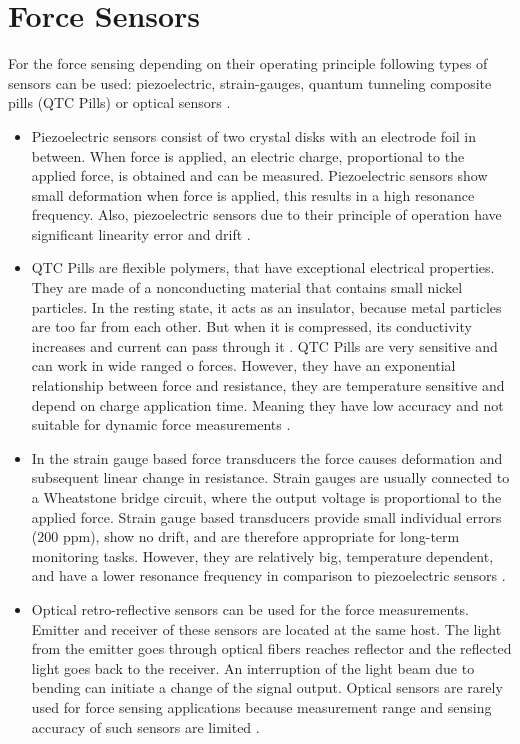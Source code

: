\section{Force Sensors}
\label{sec:ForceSensors}

For the force sensing depending on their operating principle following types of sensors can be used: piezoelectric, strain-gauges, quantum tunneling composite pills (QTC Pills) or optical sensors \cite{SGandP1}.

\begin{itemize}
\item Piezoelectric sensors consist of two crystal disks with an electrode foil in between. When force is applied, an electric charge, proportional to the applied force, is obtained and can be measured. Piezoelectric sensors show small deformation when force is applied, this results in a high resonance frequency. Also, piezoelectric sensors due to their principle of operation have significant linearity error and drift \cite{SGandP2}.

\item QTC Pills are flexible polymers, that have exceptional electrical properties. They are made of a nonconducting material that contains small nickel particles.  In the resting state, it acts as an insulator, because metal particles are too far from each other. But when it is compressed, its conductivity increases and current can pass through it \cite{azaman_characteristic_2016}. QTC Pills are very sensitive and can work in wide ranged o forces. However, they have an exponential relationship between force and resistance, they are temperature sensitive and depend on charge application time. Meaning they have low accuracy and not suitable for dynamic force measurements \cite{_quantum_2010}.

\item In the strain gauge based force transducers the force causes deformation and subsequent linear change in resistance. Strain gauges are usually connected to a Wheatstone bridge circuit, where the output voltage is proportional to the applied force. Strain gauge based transducers provide small individual errors (200 ppm), show no drift, and are therefore appropriate for long-term monitoring tasks. However, they are relatively big, temperature dependent, and have a lower resonance frequency in comparison to piezoelectric sensors \cite{SGandP1,SGandP2}.

\item Optical retro-reflective sensors can be used for the force measurements. Emitter and receiver of these sensors are located at the same host. The light from the emitter goes through optical fibers reaches reflector and the reflected light goes back to the receiver. An interruption of the light beam due to bending can initiate a change of the signal output. Optical sensors are rarely used for force sensing applications because measurement range and sensing accuracy of such sensors are limited \cite{su_fiber_optic_2017}.
\end{itemize}


